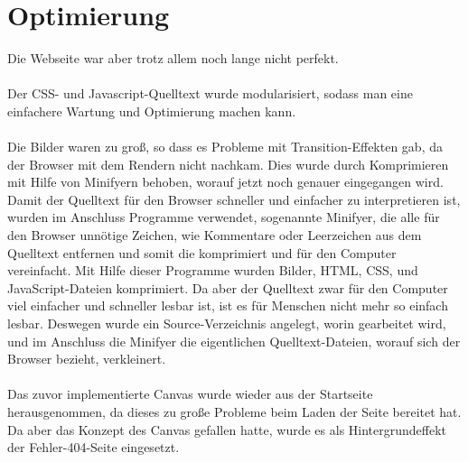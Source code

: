 \section{Optimierung}
Die Webseite war aber trotz allem noch lange nicht perfekt. 
\\
\\
Der CSS- und Javascript-Quelltext wurde modularisiert, sodass man eine einfachere Wartung und Optimierung machen kann.
\\
\\
Die Bilder waren zu groß, so dass es Probleme mit Transition-Effekten gab, da der Browser mit dem Rendern nicht nachkam. Dies wurde durch Komprimieren mit Hilfe von Minifyern behoben, worauf jetzt noch genauer eingegangen wird.
\\
Damit der Quelltext für den Browser schneller und einfacher zu interpretieren ist, wurden im Anschluss Programme verwendet, sogenannte Minifyer, die alle für den Browser unnötige Zeichen, wie Kommentare oder Leerzeichen aus dem Quelltext entfernen und somit die komprimiert und für den Computer vereinfacht. Mit Hilfe dieser Programme wurden Bilder, HTML, CSS, und JavaScript-Dateien komprimiert. Da aber der Quelltext zwar für den Computer viel einfacher und schneller lesbar ist, ist es für Menschen nicht mehr so einfach lesbar. Deswegen wurde ein Source-Verzeichnis angelegt, worin gearbeitet wird, und im Anschluss die Minifyer die eigentlichen Quelltext-Dateien, worauf sich der Browser bezieht, verkleinert.
\\
\\
Das zuvor implementierte Canvas wurde wieder aus der Startseite herausgenommen, da dieses zu große Probleme beim Laden der Seite bereitet hat. Da aber das Konzept des Canvas gefallen hatte, wurde es als Hintergrundeffekt der Fehler-404-Seite eingesetzt.
